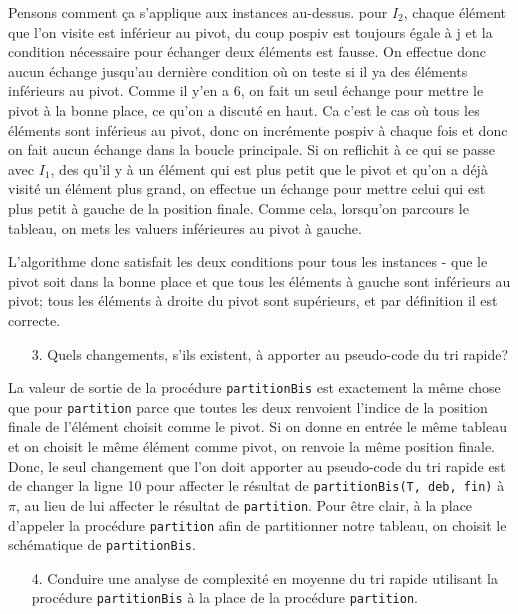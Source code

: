 \documentclass[10pt]{article} %
\begin{document}
Pensons comment \c ca s'applique aux instances au-dessus. pour $I_2$, chaque élément que l'on visite est inférieur au pivot, du coup pospiv est toujours égale à j et la
condition nécessaire pour échanger deux éléments est fausse. On effectue donc aucun échange jusqu'au dernière condition où on teste si il ya des éléments inférieurs au pivot.
Comme il y'en a 6, on fait un seul échange pour mettre le pivot à la bonne place, ce qu'on a discuté en haut. Ca c'est le cas où tous les éléments sont inférieus au pivot, donc
on incrémente pospiv à chaque fois et donc on fait aucun échange dans la boucle principale. Si on reflichit à ce qui se passe avec $I_1$, des qu'il y à un élément qui est plus petit
que le pivot et qu'on a déjà visité un élément plus grand, on effectue un échange pour mettre celui qui est plus petit à gauche de la position finale. Comme cela, lorsqu'on parcours le
tableau, on mets les valuers inférieures au pivot à gauche.

L'algorithme donc satisfait les deux conditions pour tous les instances - que le pivot soit dans la bonne place et que tous les éléments à gauche sont inférieurs au pivot; tous les éléments à
droite du pivot sont supérieurs, et par définition il est correcte.


\begin{itemize}
    \item[3.] Quels changements, s'ils existent, à apporter au pseudo-code du tri rapide?
\end{itemize}

La valeur de sortie de la procédure \texttt{partitionBis} est exactement la même chose que pour \texttt{partition} parce que toutes les deux renvoient
l'indice de la position finale de l'élément choisit comme le pivot. Si on donne en entrée le même tableau et on choisit le même élément comme pivot, on renvoie la même
position finale. Donc, le seul changement que l'on doit apporter au pseudo-code du tri rapide est
de changer la ligne 10 pour affecter le résultat de \texttt{partitionBis(T, deb, fin)} à $\pi$, au lieu de lui affecter le résultat de \texttt{partition}.
Pour être clair, à la place d'appeler la procédure \texttt{partition} afin de partitionner notre tableau, on choisit le schématique de \texttt{partitionBis}.

\begin{itemize}
    \item[4.] Conduire une analyse de complexité en moyenne du tri rapide utilisant la procédure \texttt{partitionBis} à la
    place de la procédure \texttt{partition}.
\end{itemize}
\end{document}
